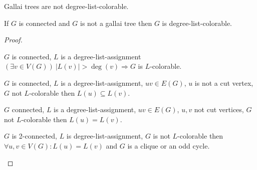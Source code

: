 \begin{observ}
	Gallai trees are not degree-list-colorable.
\end{observ}

\begin{thm}[Brooks]
	If $G$ is connected and $G$ is not a gallai tree then $G$ is degree-list-colorable.
\end{thm}

\begin{proof}
	\begin{lemma}
		$G$ is connected, $L$ is a degree-list-assignment $(\exists v \in V(G)) \ |L(v)| > \deg(v) \Rightarrow G$ is $L$-colorable.
	\end{lemma}
	
	\begin{lemma}
		$G$ is connected, $L$ is a degree-list-assignment, $uv \in E(G)$, $u$ is not a cut vertex, $G$ not $L$-colorable then $L(u) \subseteq L(v)$.
	\end{lemma}
	
	\begin{cor}
		$G$ connected, $L$ is a degree-list-assignment, $uv \in E(G)$, $u,v$ not cut vertices, $G$ not $L$-colorable then $L(u) = L(v)$.
	\end{cor}
	
	\begin{cor}
		$G$ is 2-connected, $L$ is degree-list-assignment, $G$ is not $L$-colorable then $\forall u,v \in V(G) : L(u) = L(v)$ and $G$ is a clique or an odd cycle.
	\end{cor}
\end{proof}

